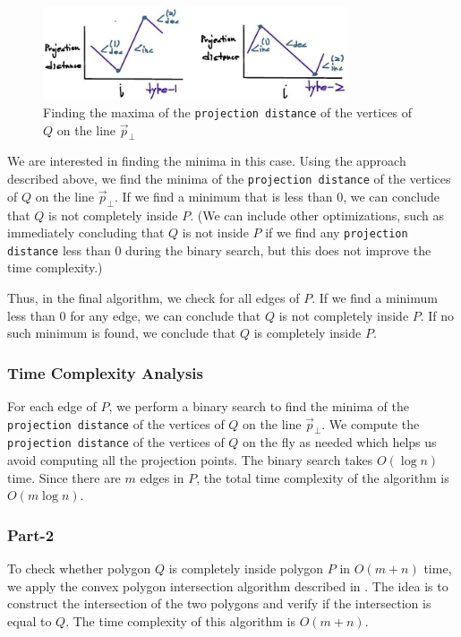 \documentclass[12pt]{article}
\begin{document}
\begin{figure}[H]
    \centering
    \includegraphics[width=0.8\textwidth]{img/5.jpg}
    \caption{Finding the maxima of the \texttt{projection distance} of the vertices of \( Q \) on the line \( \vec{p}_{\perp} \)}
    \label{fig:5}
\end{figure}

We are interested in finding the minima in this case. Using the approach described above, we find the minima of the \texttt{projection distance} of the vertices of \( Q \) on the line \( \vec{p}_{\perp} \). If we find a minimum that is less than 0, we can conclude that \( Q \) is not completely inside \( P \). (We can include other optimizations, such as immediately concluding that \( Q \) is not inside \( P \) if we find any \texttt{projection distance} less than 0 during the binary search, but this does not improve the time complexity.)

Thus, in the final algorithm, we check for all edges of \( P \). If we find a minimum less than 0 for any edge, we can conclude that \( Q \) is not completely inside \( P \). If no such minimum is found, we conclude that \( Q \) is completely inside \( P \).

\subsubsection*{Time Complexity Analysis}
For each edge of \( P \), we perform a binary search to find the minima of the \texttt{projection distance} of the vertices of \( Q \) on the line \( \vec{p}_{\perp} \). We compute the \texttt{projection distance} of the vertices of \( Q \) on the fly as needed which helps us avoid computing all the projection points. The binary search takes \( O(\log n) \) time. Since there are \( m \) edges in \( P \), the total time complexity of the algorithm is \( O(m \log n) \).

\subsubsection*{Part-2}
To check whether polygon \( Q \) is completely inside polygon \( P \) in \( O(m + n) \) time, we apply the convex polygon intersection algorithm described in \cite{OROURKE1982384}. The idea is to construct the intersection of the two polygons and verify if the intersection is equal to \( Q \). The time complexity of this algorithm is \( O(m + n) \). 
\end{document}
